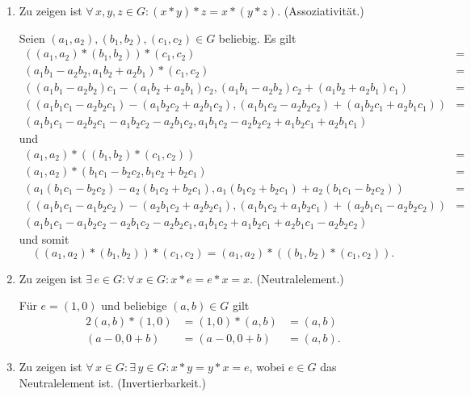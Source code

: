 \documentclass{article}
\begin{document}
\begin{enumerate}[label=\arabic*.]
    \item Zu zeigen ist $\forall\, x, y, z \in G : (x * y) * z = x * (y * z)$. (Assoziativität.)

    Seien $(a_1, a_2), (b_1, b_2), (c_1, c_2) \in G$ beliebig. Es gilt
    \begin{align*}
        ((a_1, a_2) * (b_1, b_2)) * (c_1, c_2) &=\\
        (a_1b_1 - a_2b_2, a_1b_2 + a_2b_1) * (c_1, c_2) &=\\
        ((a_1b_1 - a_2b_2)c_1 - (a_1b_2 + a_2b_1)c_2, (a_1b_1 - a_2b_2)c_2 + (a_1b_2 + a_2b_1)c_1) &=\\
        ((a_1b_1c_1 - a_2b_2c_1) - (a_1b_2c_2 + a_2b_1c_2), (a_1b_1c_2 - a_2b_2c_2) + (a_1b_2c_1 + a_2b_1c_1)) &= \\
        (a_1b_1c_1 - a_2b_2c_1 - a_1b_2c_2 - a_2b_1c_2, a_1b_1c_2 - a_2b_2c_2 + a_1b_2c_1 + a_2b_1c_1) &\phantom{=}
    \end{align*}
    und
    \begin{align*}
        (a_1, a_2) * ((b_1, b_2) * (c_1, c_2)) &=\\
        (a_1, a_2) * (b_1c_1 - b_2c_2, b_1c_2 + b_2c_1) &=\\
        (a_1(b_1c_1 - b_2c_2) - a_2(b_1c_2 + b_2c_1), a_1(b_1c_2 + b_2c_1) + a_2(b_1c_1 - b_2c_2)) &=\\
        ((a_1b_1c_1 - a_1b_2c_2) - (a_2b_1c_2 + a_2b_2c_1), (a_1b_1c_2 + a_1b_2c_1) + (a_2b_1c_1 - a_2b_2c_2)) &=\\
        (a_1b_1c_1 - a_1b_2c_2 - a_2b_1c_2 - a_2b_2c_1, a_1b_1c_2 + a_1b_2c_1 + a_2b_1c_1 - a_2b_2c_2) &\phantom{=}
    \end{align*}
    und somit
    \begin{equation*}
        ((a_1, a_2) * (b_1, b_2)) * (c_1, c_2) = (a_1, a_2) * ((b_1, b_2) * (c_1, c_2)).
    \end{equation*}

    \item Zu zeigen ist $\exists\, e \in G : \forall\, x \in G : x * e = e *x = x$. (Neutralelement.)

    Für $e = (1, 0)$ und beliebige $(a, b) \in G$ gilt
    \begin{alignat*}{2}
        (a, b) * (1, 0) &= (1, 0) * (a, b) &= (a, b)\\
        (a - 0, 0 + b) &= (a - 0, 0 + b) &= (a, b).
    \end{alignat*}

    \item Zu zeigen ist $\forall\, x \in G : \exists\, y \in G : x * y = y * x = e$, wobei $e \in G$ das Neutralelement ist. (Invertierbarkeit.)


\end{enumerate}
\end{document}
